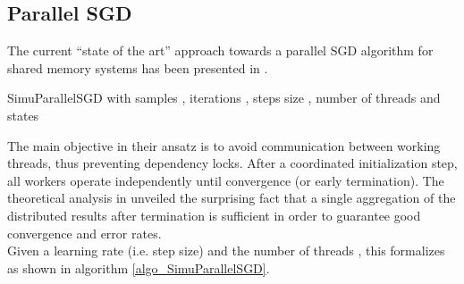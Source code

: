 \documentclass{acm_proc_article-sp}
\begin{document}
\subsection{Parallel SGD\label{sec_psgd}}
The current ``state of the art'' approach towards a parallel SGD
algorithm for shared memory systems has been presented in \cite{SGDsmola}.
\begin{algorithm}
\caption{SimuParallelSGD 
with samples , iterations , steps size 
, number of threads  and states }
\label{algo_SimuParallelSGD}
\begin{algorithmic}[1]
\Require{}
\ForAll{ }
\EndFor 
\EndFor
{}
\State{\Return }
\end{algorithmic}
\end{algorithm}
The main objective in their ansatz is to avoid communication between working
threads, thus preventing dependency locks. After a coordinated initialization
step, all workers operate independently until convergence (or early termination).
The theoretical analysis in \cite{SGDsmola} unveiled the surprising fact that a single
aggregation of the distributed results after termination is sufficient in order to 
guarantee good convergence and error rates.\\
Given a learning rate (i.e. step size)  and the number of threads ,
this formalizes as shown in algorithm \ref{algo_SimuParallelSGD}.
\end{document}
